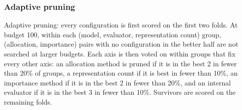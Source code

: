 \subsubsection{Adaptive pruning}

Adaptive pruning: every configuration is first scored on the first two folds. At budget 100, within each (model, evaluator, representation count) group, (allocation, importance) pairs with no configuration in the better half are not searched at larger budgets. Each axis is then voted on within groups that fix every other axis: an allocation method is pruned if it is in the best 2 in fewer than 20\% of groups, a representation count if it is best in fewer than 10\%, an importance method if it is in the best 2 in fewer than 20\%, and an internal evaluator if it is in the best 3 in fewer than 10\%. Survivors are scored on the remaining folds.

